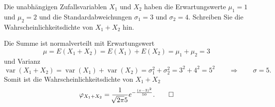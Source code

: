 Die unabhängigen Zufallsvariablen $X_1$ und $X_2$ haben die Erwartungswerte
$\mu_1=1$ und $\mu_2=2$ und die Standardabweichungen $\sigma_1=3$ und
$\sigma_2=4$.
Schreiben Sie die Wahrscheinlichkeitsdichte von $X_1+X_2$ hin.

\begin{loesung}
Die Summe ist normalverteilt mit Erwartungswert
\[
\mu = E(X_1+X_2)=E(X_1)+E(X_2)=\mu_1+\mu_2 = 3
\]
und Varianz
\[
\operatorname{var}(X_1+X_2)
=
\operatorname{var}(X_1)
+
\operatorname{var}(X_2)
=
\sigma_1^2 + \sigma_2^2
=
3^2+4^2
=
5^2
\qquad\Rightarrow\qquad
\sigma=5.
\]
Somit ist die Wahrscheinlichkeitsdichte von $X_1+X_2$
\[
\varphi_{X_1+X_2}
=
\frac{1}{\!\sqrt{2\pi}5}
e^{-\frac{(x-3)^2}{50}}.
\qedhere
\]
\end{loesung}
